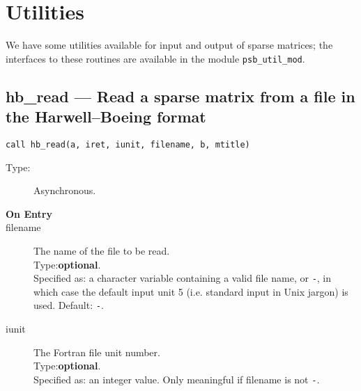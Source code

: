 \section{Utilities}
\label{sec:util}

We have some utilities available for input and output of
sparse matrices; the interfaces to these routines are available in the
module \verb|psb_util_mod|.




\clearpage\subsection{ hb\_read --- Read a sparse matrix from a file in the
  Harwell--Boeing format}


\begin{lstlisting}
call hb_read(a, iret, iunit, filename, b, mtitle)
\end{lstlisting}

\begin{description}
\item[Type:] Asynchronous.
\item[\bf  On Entry ]
\item[filename] The name of the file to be read.\\
Type:{\bf optional}.\\
Specified as: a character variable containing a valid file name, or
\verb|-|, in which case the default input unit  5 (i.e. standard input
in Unix jargon) is used. Default: \verb|-|. 
\item[iunit] The Fortran file unit number.\\
Type:{\bf optional}.\\
Specified as: an integer value. Only meaningful if filename is not \verb|-|.
\end{description}

